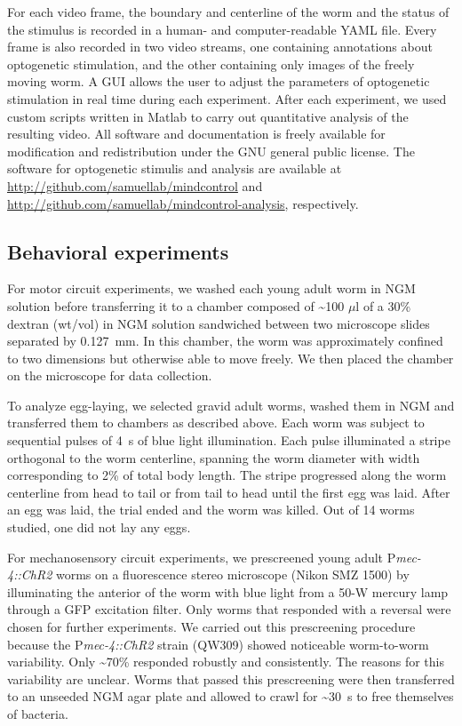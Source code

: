 For each video frame, the boundary and centerline of the worm and the status of the stimulus is recorded in a human- and computer-readable YAML file. Every frame is also recorded in two video streams, one containing annotations about optogenetic stimulation, and the other containing only images of the freely moving worm. A GUI allows the user to adjust the parameters of optogenetic stimulation in real time during each experiment. After each experiment, we used custom scripts written in Matlab to carry out quantitative analysis of the resulting video. All software and documentation is freely available for modification and redistribution under the GNU general public license. The software for optogenetic stimulis and analysis are available at \url{http://github.com/samuellab/mindcontrol} and  \url{http://github.com/samuellab/mindcontrol-analysis}, respectively.


\subsection{Behavioral experiments}

For motor circuit experiments, we washed each young adult worm in NGM solution before transferring it to a chamber composed of \textasciitilde100 $\mu$l of a 30\% dextran (wt/vol) in NGM solution sandwiched between two microscope slides separated by 0.127~mm. In this chamber, the worm was approximately confined to two dimensions but otherwise able to move freely. We then placed the chamber on the microscope for data collection.

To analyze egg-laying, we selected gravid adult worms, washed them in NGM and transferred them to chambers as described above. Each worm was subject to sequential pulses of 4~s of blue light illumination. Each pulse illuminated a stripe orthogonal to the worm centerline, spanning the worm diameter with width corresponding to 2\% of total body length. The stripe progressed along the worm centerline from head to tail or from tail to head until the first egg was laid. After an egg was laid, the trial ended and the worm was killed. Out of 14 worms studied, one did not lay any eggs.

For mechanosensory circuit experiments, we prescreened young adult P\textit{mec-4::ChR2} worms on a fluorescence stereo microscope (Nikon SMZ 1500) by illuminating the anterior of the worm with blue light from a 50-W mercury lamp through a GFP excitation filter. Only worms that responded with a reversal were chosen for further experiments. We carried out this prescreening procedure because the P\textit{mec-4::ChR2} strain (QW309) showed noticeable worm-to-worm variability. Only \textasciitilde70\% responded robustly and consistently. The reasons for this variability are unclear. Worms that passed this prescreening were then transferred to an unseeded NGM agar plate and  allowed to crawl for \textasciitilde30~s to free themselves of bacteria. 

